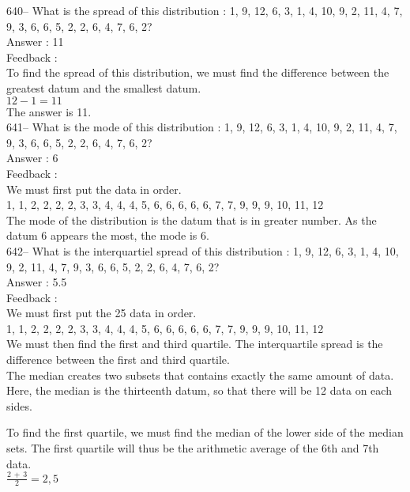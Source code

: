 \documentclass[letterpaper, 12pt]{article}
\begin{document}
640-- What is the spread of this distribution : 1, 9, 12, 6, 3, 1, 4, 10, 9,
2, 11, 4, 7, 9, 3, 6, 6, 5, 2, 2, 6, 4, 7, 6, 2?\\

Answer : 11\\

Feedback : \\
To find the spread of this distribution, we must find the difference between the greatest datum and the smallest datum.  \\
$12-1=11$\\
The answer is 11.\\

641-- What is the mode of this distribution : 1, 9, 12, 6, 3, 1, 4, 10, 9, 2,
11, 4, 7, 9, 3, 6, 6, 5, 2, 2, 6, 4, 7, 6, 2?\\

Answer : 6\\

Feedback : \\
We must first put the data in order.\\
1, 1, 2, 2, 2, 2, 3, 3, 4, 4, 4, 5, 6, 6, 6, 6, 6, 7, 7, 9, 9, 9, 10, 11,
12\\
The mode of the distribution is the datum that is in greater number. As the datum 6 appears the most, the mode is 6.\\


642-- What is the interquartiel spread of this distribution : 1, 9, 12, 6,
3, 1, 4, 10, 9, 2, 11, 4, 7, 9, 3, 6, 6, 5, 2, 2, 6, 4, 7, 6, 2?\\

Answer : 5.5\\

Feedback : \\
We must first put the 25 data in order.\\
1, 1, 2, 2, 2, 2, 3, 3, 4, 4, 4, 5, 6, 6, 6, 6, 6, 7, 7, 9, 9, 9, 10, 11,
12\\
We must then find the first and third quartile.
The interquartile spread is the difference between the first and third quartile.\\
The median creates two subsets that contains exactly the same amount of data. Here, the median is the thirteenth datum, so that there will be 12 data on each sides.

To find the first quartile, we must find the median of the lower side of the median sets. The first quartile will thus be the arithmetic average of the 6th and 7th data. \\[2mm]
$\frac{2\,+\,3}{2}=2,5$\\[2mm]
\end{document}
